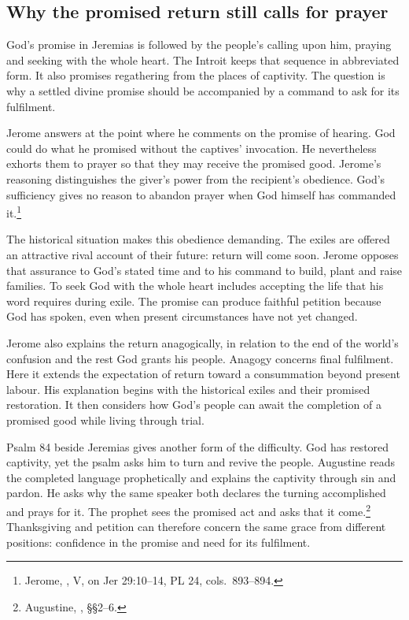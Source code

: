 \subsection{Why the promised return still calls for prayer}
God's promise in Jeremias is followed by the people's calling upon him,
praying and seeking with the whole heart. The Introit keeps that sequence
in abbreviated form. It also promises regathering from the places of
captivity. The question is why a settled divine promise should be
accompanied by a command to ask for its fulfilment.

Jerome answers at the point where he comments on the promise of hearing.
God could do what he promised without the captives' invocation. He
nevertheless exhorts them to prayer so that they may receive the promised
good. Jerome's reasoning distinguishes the giver's power from the
recipient's obedience. God's sufficiency gives no reason to abandon
prayer when God himself has commanded it.\footnote{Jerome,
, V, on Jer 29:10--14, PL 24,
cols.~893--894.}

The historical situation makes this obedience demanding. The exiles
are offered an attractive rival account of their future: return will
come soon. Jerome opposes that assurance to God's stated time and to
his command to build, plant and raise families. To seek God with the
whole heart includes accepting the life that his word requires during
exile. The promise can produce faithful petition because God has
spoken, even when present circumstances have not yet changed.

Jerome also explains the return anagogically, in relation to the end
of the world's confusion and the rest God grants his people. Anagogy
concerns final fulfilment. Here it extends the expectation of return
toward a consummation beyond present labour. His explanation begins
with the historical exiles and their promised restoration. It then
considers how God's people can await the completion of a promised good
while living through trial.

Psalm 84 beside Jeremias gives another form of the difficulty. God
has restored captivity, yet the psalm asks him to turn and revive the
people. Augustine reads the completed language prophetically and
explains the captivity through sin and pardon. He asks why the same
speaker both declares the turning accomplished and prays for it.
The prophet sees the promised act and asks that it come.\footnote{Augustine,
, §§2--6.} Thanksgiving and petition can
therefore concern the same grace from different positions: confidence
in the promise and need for its fulfilment.

